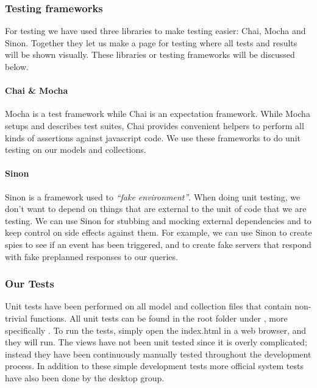 \subsubsection{Testing frameworks}
For testing we have used three libraries to make testing easier: Chai, Mocha and Sinon. Together they let us make a page for testing where all tests and results will be shown visually.
These libraries or testing frameworks will be discussed below.
\paragraph{Chai \& Mocha}
Mocha\cite{web_8} is a test framework while Chai\cite{web_7} is an expectation framework. While Mocha setups and describes test suites, Chai provides convenient helpers to perform all kinds of assertions against javascript code. We use these frameworks to do unit testing on our models and collections.

\paragraph{Sinon}
Sinon\cite{web_9} is a framework used to \textit{“fake environment”}. When doing unit testing, we don’t want to depend on things that are external to the unit of code that we are testing. We can use Sinon for stubbing and mocking external dependencies and to keep control on side effects against them. For example, we can use Sinon to create spies to see if an event has been triggered, and to create fake servers that respond with fake preplanned responses to our queries.

\subsubsection{Our Tests}
Unit tests have been performed on all model and collection files that contain non-trivial functions. All unit tests can be found in the root folder under , more specifically . To run the tests, simply open the index.html in a web browser, and they will run. The views have not been unit tested since it is overly complicated; instead they have been continuously manually tested throughout the development process. In addition to these simple development tests more official system tests have also been done by the desktop group.
